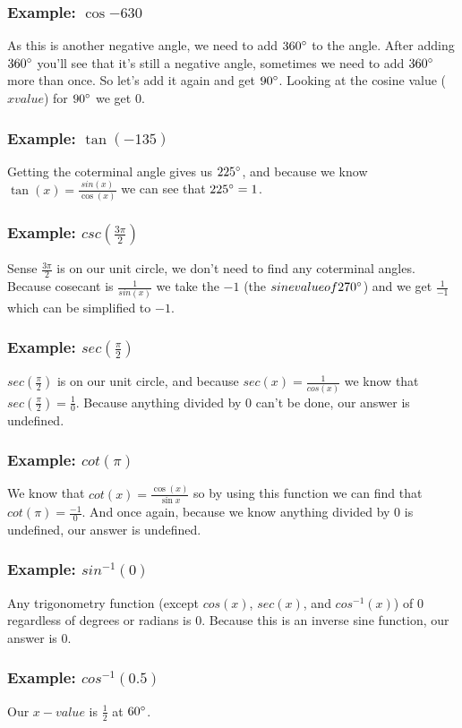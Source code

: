 \documentclass[12pt, english]{article}
\begin{document}
	\subsubsection*{Example: $\cos{-630}$}
	As this is another negative angle, we need to add $360\degree$ to the angle. After adding $360\degree$ you'll see that it's still a negative
	angle, sometimes we need to add $360\degree$ more than once. So let's add it again and get $90\degree$. Looking at the cosine
	value ($x value$) for $90\degree$ we get $0$.
	\subsubsection*{Example: $\tan(-135)$}
	Getting the coterminal angle gives us $225\degree$, and because we know $\tan(x) = \frac{sin(x)}{\cos(x)}$ we can see that
	$225\degree = 1$.
	\subsubsection*{Example: $csc(\frac{3\pi}{2})$}
	Sense $\frac{3\pi}{2}$ is on our unit circle, we don't need to find any coterminal angles. Because cosecant is $\frac{1}{sin(x)}$ we
	take the $-1$ (the $sine value of 270\degree$) and we get $\frac{1}{-1}$ which can be simplified to $-1$.
	\subsubsection*{Example: $sec(\frac{\pi}{2})$}
	$sec(\frac{\pi}{2})$ is on our unit circle, and because $sec(x) = \frac{1}{cos(x)}$ we know that $sec(\frac{\pi}{2}) = \frac{1}{0}$.
	Because anything divided by $0$ can't be done, our answer is undefined.
	\subsubsection*{Example: $cot(\pi)$}
	We know that $cot(x) = \frac{\cos(x)}{\sin{x}}$ so by using this function we can find that $cot(\pi) = \frac{-1}{0}$. And once again, because
	we know anything divided by $0$ is undefined, our answer is undefined.
	\subsubsection*{Example: $sin^{-1}(0)$}
	Any trigonometry function (except $cos(x)$, $sec(x)$, and $cos^{-1}(x)$) of $0$ regardless of degrees or radians is $0$. Because this
	is an inverse sine function, our answer is $0$.
	\subsubsection*{Example: $cos^{-1}(0.5)$}
	Our $x-value$ is $\frac{1}{2}$ at $60\degree$.
\end{document}
